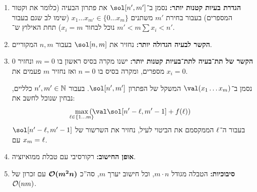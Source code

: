 \documentclass[]{../../../../tex/classes/homework}
\begin{document}
	
	\begin{enumerate}
		\item \textbf{הגדרת בעיות קטנות יותר: }נסמן ב־$\sol[n', m']$ את פתרון הבעיה (כלומר את וקטור המספרים) בעבור בחירת $m'$ משתנים $x_1 \dots x_{m'} \in \{0 \dots x_m\}$ (שימו לב שגם בעבור $m' < m$ נוכל לבחור $x_i = m$) תחת האילוץ ש־$\sum x_i < n'$. 
		\item \textbf{הקשר לבעיה הגדולה יותר: }נחזיר את $\sol[n, m]$ בעבור $n, m$ המקוריים. 
		\item \textbf{הקשר של תת־בעיה לתת־בעיות קטנות יותר: }ישנו מקרה בסיס ראשון בו $m = 0$ ונחזיר $0$ מספרים, ומקרה בסיס בו $n = 0$ ואז נחזיר $m$ פעמים את $x_i = 0$. 
		
		נסמן ב־$\val(x_1 \dots x_m)$ המשקל של הפתרון $\sol[n', m']$. 	בעבור $n', m' \in \mathbb{N}$ כלליים, נבחין שנוכל לחשב את: 
		\[ \max_{\mathclap{\ml \in \{1 \dots m\}}}\cl{\val \sol[n' - \ml, m' - 1] + f(\ml)} \]
		בעבור ה־$\ell$ הממקסמם את הביטוי לעיל, נחזיר את השרשור של $\sol[n' - \ml, m' - 1]$ עם $x_m = \ell$. 
		\item \textbf{אופן החישוב: }רקורסיבי עם טבלת ממואיזציה. 
		\item \textbf{סיבוכיות: }הטבלה מגודל $m \cdot n$, וכל חישוב יערך $m$, סה''כ $\bm{\mathcal{O}(m^{2}n)}$ עם זכרון של $\mathcal{O}(nm)$. 
	\end{enumerate}
	
	\ndoc
\end{document}
